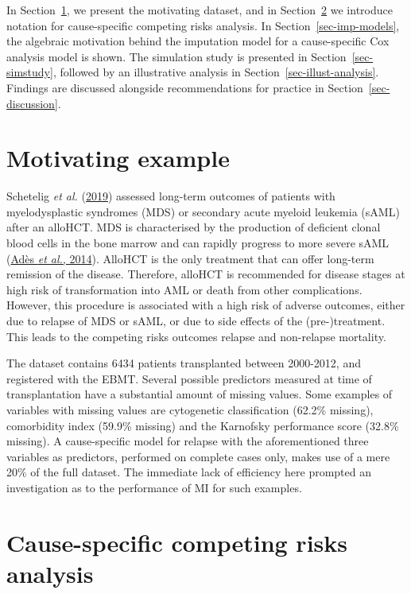 \documentclass[
  letterpaper,
  DIV=11,
  numbers=noendperiod]{scrreprt}
\begin{document}
In Section~\ref{sec-motivating-example}, we present the motivating
dataset, and in Section~\ref{sec-comprisks} we introduce notation for
cause-specific competing risks analysis. In
Section~\ref{sec-imp-models}, the algebraic motivation behind the
imputation model for a cause-specific Cox analysis model is shown. The
simulation study is presented in Section~\ref{sec-simstudy}, followed by
an illustrative analysis in Section~\ref{sec-illust-analysis}. Findings
are discussed alongside recommendations for practice in
Section~\ref{sec-discussion}.

\hypertarget{sec-motivating-example}{%
\section{Motivating example}\label{sec-motivating-example}}

Schetelig \emph{et al.}
(\protect\hyperlink{ref-scheteligLateTreatmentrelatedMortality2019}{2019})
assessed long-term outcomes of patients with myelodysplastic syndromes
(MDS) or secondary acute myeloid leukemia (sAML) after an alloHCT. MDS
is characterised by the production of deficient clonal blood cells in
the bone marrow and can rapidly progress to more severe sAML
(\protect\hyperlink{ref-adesMyelodysplasticSyndromes2014}{Adès \emph{et
al.}, 2014}). AlloHCT is the only treatment that can offer long-term
remission of the disease. Therefore, alloHCT is recommended for disease
stages at high risk of transformation into AML or death from other
complications. However, this procedure is associated with a high risk of
adverse outcomes, either due to relapse of MDS or sAML, or due to side
effects of the (pre-)treatment. This leads to the competing risks
outcomes relapse and non-relapse mortality.

The dataset contains 6434 patients transplanted between 2000-2012, and
registered with the EBMT. Several possible predictors measured at time
of transplantation have a substantial amount of missing values. Some
examples of variables with missing values are cytogenetic classification
(62.2\% missing), comorbidity index (59.9\% missing) and the Karnofsky
performance score (32.8\% missing). A cause-specific model for relapse
with the aforementioned three variables as predictors, performed on
complete cases only, makes use of a mere 20\% of the full dataset. The
immediate lack of efficiency here prompted an investigation as to the
performance of MI for such examples.

\hypertarget{sec-comprisks}{%
\section{Cause-specific competing risks analysis}\label{sec-comprisks}}
\end{document}
